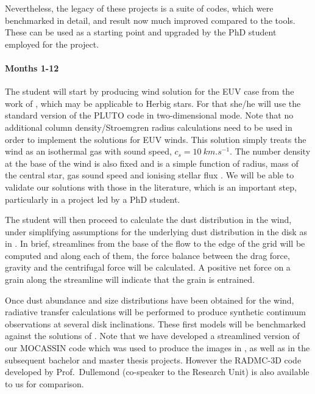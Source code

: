 \documentclass[10pt,fleqn,twoside]{article}
\begin{document}
 Nevertheless, the legacy of these projects is a suite of
codes, which were benchmarked in detail, and result now much improved
compared to the \citet{2011MNRAS.411.1104O} tools. These can be
used as a starting point and upgraded by the PhD student employed for the project.  


\paragraph{Months 1-12}

The student will start by producing wind solution for the EUV case
from the work of \citet{2004ApJ...607..890F}, which may be applicable
to Herbig stars. For that she/he will use the standard version of the
PLUTO code \citep{2007ApJS..170..228M, 2012A&A...545A.152M} in
two-dimensional mode. Note that no additional column density/Stroemgren radius
calculations need to be used in order to implement the \citet{2004ApJ...607..890F}
solutions for EUV winds. This solution simply treats the
wind as an isothermal gas with sound speed, $c_s =
\SI{10}{km.s^{-1}}$.
The number density at the base of the wind is also fixed and is a simple
function of radius, mass of the central star, gas sound speed and
ionising stellar flux 
\citep{1994ApJ...428..654H,2004ApJ...607..890F, 2009ApJ...704..989A}. 
We will be able to validate our solutions with those in the
literature, which is an important step, particularly in a project led
by a PhD student. 

The student will then proceed to calculate the dust
distribution in the wind, under simplifying assumptions for the
underlying dust distribution in the disk as in \citet{2011MNRAS.411.1104O}. In
brief, streamlines from the base of the flow to the edge of the grid
will be computed and along each of them, the force balance between the
drag force, gravity and the centrifugal force will be calculated. A
positive net force on a grain along the streamline will indicate that
the grain is entrained.

Once dust abundance and size distributions have been obtained for the
wind, radiative transfer calculations will be performed to produce
synthetic continuum observations at several disk inclinations. 
These first models will be benchmarked against the solutions
of \citet{2011MNRAS.411.1104O}. Note that we have developed a
streamlined version of our MOCASSIN code which was used to produce the
images in \citet{2011MNRAS.411.1104O}, as well as in the subsequent
bachelor and master thesis projects. However the RADMC-3D code
developed by Prof.\ Dullemond (co-speaker to the Research Unit) is also
available to us for comparison. 
\end{document}

